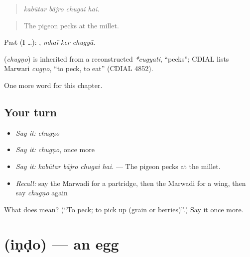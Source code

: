 \begin{quote}
   
\end{quote}

\begin{quote}
\emph{kabūtar bājro chugai hai.}
\end{quote}

\begin{quote}
The pigeon pecks at the millet.
\end{quote}

Past (I …):   , \emph{mhaĩ ker chugyā}.

\begin{cousinweb}
\textbf{} (\emph{chugṇo}) is inherited from a reconstructed \emph{*cugyati}, \textquotedblleft{}pecks\textquotedblright{}; CDIAL lists Marwari \emph{cugṇo}, \textquotedblleft{}to peck, to eat\textquotedblright{} (CDIAL 4852).
\end{cousinweb}

\begin{grammarlens}[title={What you've built}]
One more word for this chapter.
\end{grammarlens}

\subsection*{Your turn}
\begin{itemize}
\raggedright
  \item \emph{Say it:} \emph{chugṇo}
  \item \emph{Say it:} \emph{chugṇo}, once more
  \item \emph{Say it:} \emph{kabūtar bājro chugai hai.} — The pigeon pecks at the millet.
  \item \emph{Recall:} say the Marwadi for a partridge, then the Marwadi for a wing, then say \emph{chugṇo} again
\end{itemize}

\begin{tcolorbox}[breakable,colback=teal!4,colframe=teal!35!black,title={Before you move on}]
What does  mean? (\textquotedblleft{}To peck; to pick up (grain or berries)\textquotedblright{}.) Say it once more.
\end{tcolorbox}
\section[\texorpdfstring{\mw{इंडो} (iṇḍo)}{इंडो (iṇḍo)}]{ (iṇḍo) — an egg}

